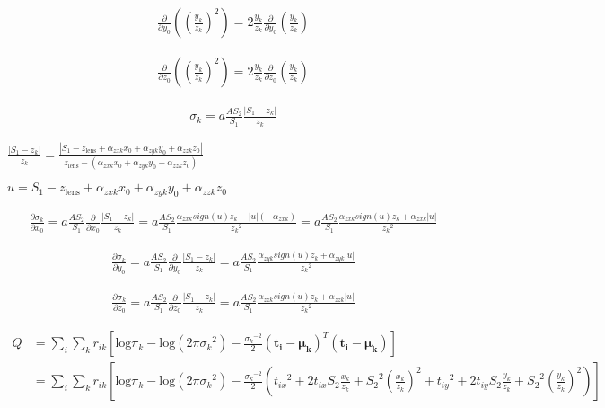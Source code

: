 \documentclass{article}
\begin{document}
\begin{align}
\frac{\partial}{\partial y_0}\left(\left(\frac{y_k}{z_k}\right)^2\right) = 2 \frac{y_k}{z_k} \frac{\partial}{\partial y_0}\left(\frac{y_k}{z_k}\right)
\end{align}

\begin{align}
\frac{\partial}{\partial z_0}\left(\left(\frac{y_k}{z_k}\right)^2\right) = 2 \frac{y_k}{z_k} \frac{\partial}{\partial z_0}\left(\frac{y_k}{z_k}\right)
\end{align}





\begin{align}
\sigma_k = a \frac{AS_2}{S_1} \frac{|S_1-z_k|}{z_k}
\end{align}

$ \frac{|S_1-z_k|}{z_k} = \frac{|S_1 - z_\text{lens} + \alpha_{zxk}x_0 + \alpha_{zyk}y_0 + \alpha_{zzk}z_0|}{z_\text{lens} - (\alpha_{zxk}x_0 + \alpha_{zyk}y_0 + \alpha_{zzk}z_0)} $

$ u = S_1 - z_\text{lens} + \alpha_{zxk}x_0 + \alpha_{zyk}y_0 + \alpha_{zzk}z_0 $


\begin{align}
\frac{\partial \sigma_k}{\partial x_0} = a\frac{AS_2}{S_1} \frac{\partial}{\partial x_0} \frac{|S_1-z_k|}{z_k} =  a\frac{AS_2}{S_1} \frac{\alpha_{zxk}sign(u)z_k - |u|(-\alpha_{zxk})}{{z_k}^2} =  a\frac{AS_2}{S_1} \frac{\alpha_{zxk}sign(u)z_k + \alpha_{zxk}|u|}{{z_k}^2}
\end{align}

\begin{align}
\frac{\partial \sigma_k}{\partial y_0} = a\frac{AS_2}{S_1} \frac{\partial}{\partial y_0} \frac{|S_1-z_k|}{z_k} =  a\frac{AS_2}{S_1} \frac{\alpha_{zyk}sign(u)z_k + \alpha_{zyk}|u|}{{z_k}^2}
\end{align}

\begin{align}
\frac{\partial \sigma_k}{\partial z_0} =  a\frac{AS_2}{S_1} \frac{\partial}{\partial z_0} \frac{|S_1-z_k|}{z_k} =   a\frac{AS_2}{S_1} \frac{\alpha_{zzk}sign(u)z_k + \alpha_{zzk}|u|}{{z_k}^2}
\end{align}


\begin{align} \label{eqn:Q_no_weight}
Q &= \sum_i \sum_k r_{ik} \left[ \text{log}\pi_k - \text{log}(2\pi{\sigma_k}^2) - \frac{{\sigma_k}^{-2}}{2}(\bm{t_i}-\bm{\mu_k})^T(\bm{t_i}-\bm{\mu_k}) \right] \\
&= \sum_i \sum_k r_{ik} \left[ \text{log}\pi_k - \text{log}(2\pi{\sigma_k}^2) - \frac{{\sigma_k}^{-2}}{2} \left({t_{ix}}^2 + 2t_{ix}S_2\frac{x_k}{z_k} + {S_2}^2\left(\frac{x_k}{z_k}\right)^2 + {t_{iy}}^2 + 2t_{iy}S_2\frac{y_k}{z_k} + {S_2}^2\left(\frac{y_k}{z_k}\right)^2 \right) \right]
\end{align}
\end{document}
